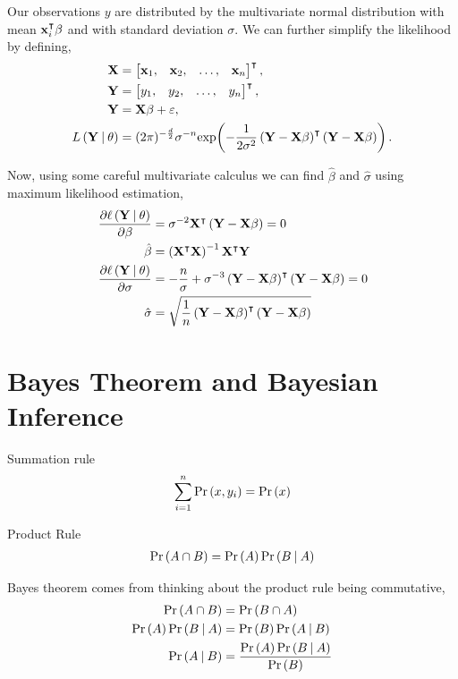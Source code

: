 Our observations $y$ are distributed by the multivariate normal distribution with mean $\mathbf{x}_i^\intercal\beta$ and with standard deviation $\sigma$. We can further simplify the likelihood by defining,
\begin{align*}
    \mathbf{X} &= \begin{bmatrix} \mathbf{x}_1, & \mathbf{x}_2, & \dots, & \mathbf{x}_n \end{bmatrix}^\intercal,\\
    \mathbf{Y} &= \begin{bmatrix} y_1, & y_2, & \dots, & y_n \end{bmatrix}^\intercal,\\
    \mathbf{Y} &= \mathbf{X}\beta + \varepsilon, \\
    L\left( \mathbf{Y} \:\middle|\: \theta \right) &= (2\pi)^{-\frac{d}{2}}\sigma^{-n}\mathrm{exp}\!\left( -\frac{1}{2\sigma^2}\left(\mathbf{Y} - \mathbf{X}\beta\right)^\intercal\left(\mathbf{Y} - \mathbf{X}\beta\right) \right).
\end{align*}

Now, using some careful multivariate calculus we can find $\hat{\beta}$ and $\hat{\sigma}$ using maximum likelihood estimation,
\begin{align*}
    \dfrac{\partial \ell\left( \mathbf{Y} \:\middle|\: \theta \right)}{\partial \beta} &= \sigma^{-2}\mathbf{X}^\intercal\left(\mathbf{Y} - \mathbf{X}\beta\right)=0\\
    \hat{\beta} &= \left(\mathbf{X}^\intercal\mathbf{X}\right)^{-1}\mathbf{X}^\intercal\mathbf{Y}\\
    \dfrac{\partial \ell\left( \mathbf{Y} \:\middle|\: \theta \right)}{\partial \sigma} &= -\frac{n}{\sigma} + \sigma^{-3}\left(\mathbf{Y} - \mathbf{X}\beta\right)^\intercal\left(\mathbf{Y} - \mathbf{X}\beta\right)=0\\
    \hat{\sigma} &= \sqrt{\frac{1}{n}\left(\mathbf{Y} - \mathbf{X}\beta\right)^\intercal\left(\mathbf{Y} - \mathbf{X}\beta\right)}
\end{align*}


\section{Bayes Theorem and Bayesian Inference}

Summation rule
\begin{align}
    \sum_{i=1}^{n} \mathrm{Pr} \left( x, y_i \right) = \mathrm{Pr} \left( x \right)
\end{align}

Product Rule
\begin{align}
    \mathrm{Pr} \left( A \cap B \right) = \mathrm{Pr} \left( A \right)\mathrm{Pr} \left( B \:\middle|\: A \right)
\end{align}

Bayes theorem comes from thinking about the product rule being commutative,
\begin{align}
    \mathrm{Pr} \left( A \cap B \right) &= \mathrm{Pr} \left( B \cap A \right) \\ 
    \mathrm{Pr} \left( A \right)\mathrm{Pr} \left( B \:\middle|\: A \right) &= \mathrm{Pr} \left( B \right)\mathrm{Pr} \left( A \:\middle|\: B \right)\\
    \mathrm{Pr} \left( A \:\middle|\: B \right) &= \frac{\mathrm{Pr} \left( A \right)\mathrm{Pr} \left( B \:\middle|\: A \right)}{\mathrm{Pr} \left( B \right)}
\end{align}

